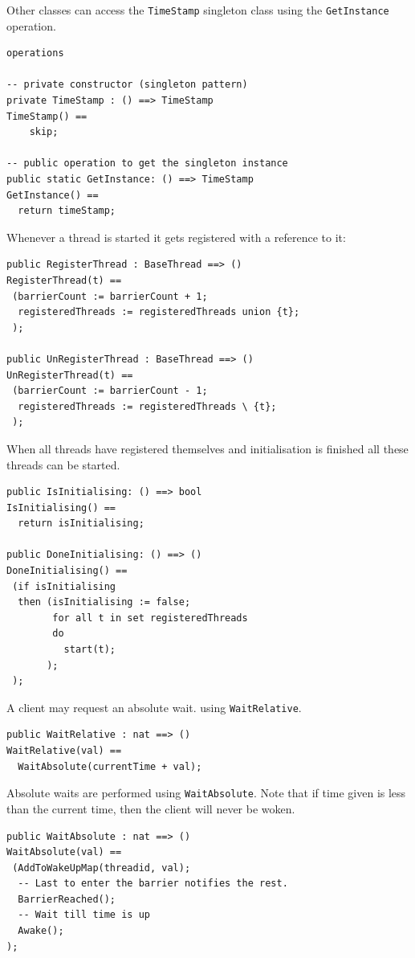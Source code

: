 \documentclass{overturerepchap}
\begin{document}
Other classes can access the \texttt{TimeStamp} singleton class using the \texttt{GetInstance} operation.

\begin{lstlisting}
operations

-- private constructor (singleton pattern)
private TimeStamp : () ==> TimeStamp
TimeStamp() ==
	skip;

-- public operation to get the singleton instance
public static GetInstance: () ==> TimeStamp
GetInstance() ==
  return timeStamp;
\end{lstlisting}

Whenever a thread is started it gets registered with a reference to it:

\begin{lstlisting}
public RegisterThread : BaseThread ==> ()
RegisterThread(t) ==
 (barrierCount := barrierCount + 1;
  registeredThreads := registeredThreads union {t};  
 );
 
public UnRegisterThread : BaseThread ==> ()
UnRegisterThread(t) ==
 (barrierCount := barrierCount - 1;
  registeredThreads := registeredThreads \ {t};
 );
\end{lstlisting}

When all threads have registered themselves and initialisation is finished
all these threads can be started.

\begin{lstlisting}
public IsInitialising: () ==> bool
IsInitialising() ==
  return isInitialising;
 
public DoneInitialising: () ==> ()
DoneInitialising() ==
 (if isInitialising
  then (isInitialising := false;
        for all t in set registeredThreads 
        do
          start(t);
       );
 );
\end{lstlisting}

A client may request an absolute wait. using \texttt{WaitRelative}.

\begin{lstlisting}
public WaitRelative : nat ==> ()
WaitRelative(val) ==
  WaitAbsolute(currentTime + val);
\end{lstlisting}

Absolute waits are performed using \texttt{WaitAbsolute}. Note that if time
given is less than the current time, then the client will never be
woken.

\begin{lstlisting}
public WaitAbsolute : nat ==> ()
WaitAbsolute(val) ==
 (AddToWakeUpMap(threadid, val);
  -- Last to enter the barrier notifies the rest.
  BarrierReached();
  -- Wait till time is up
  Awake();
);
\end{lstlisting}
\end{document}
